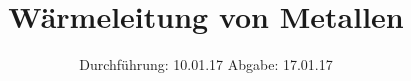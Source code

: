 

\subject{V204}
\title{Wärmeleitung von Metallen}
\date{
  Durchführung: 10.01.17
  \hspace{3em}
  Abgabe: 17.01.17
}



\maketitle
\thispagestyle{empty}
\tableofcontents
\newpage






\printbibliography



